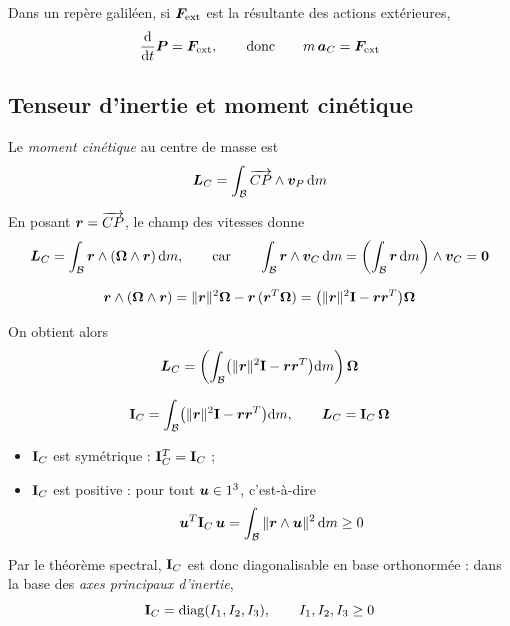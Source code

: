 \begin{theoreme}
    Dans un repère galiléen, si $\bm{F}_{\mathrm{ext}}$ est la
    résultante des actions extérieures,
    \[
        \frac{\mathrm{d}}{\mathrm{d} t}\bm{P} = \bm{F}_{\mathrm{ext}},
        \qquad\text{donc}\qquad
        m\,\bm{a}_C = \bm{F}_{\mathrm{ext}}
    \]
\end{theoreme}

\subsection{Tenseur d'inertie et moment cinétique}

\begin{definition}
    Le \emph{moment cinétique} au centre de masse est
    \[
        \bm{L}_C = \int_{\mathcal{B}}
        \overrightarrow{CP}\wedge\bm{v}_P\,\mathrm{d} m
    \]
\end{definition}

En posant $\bm{r} = \overrightarrow{CP}$, le champ des vitesses donne
\[
    \bm{L}_C = \int_{\mathcal{B}}
    \bm{r}\wedge(\bm{\Omega}\wedge\bm{r})\,\mathrm{d} m,
    \qquad\text{car}\qquad
    \int_{\mathcal{B}} \bm{r}\wedge\bm{v}_C\,\mathrm{d} m
    = \left(\int_{\mathcal{B}}\bm{r}\,\mathrm{d} m\right)\wedge\bm{v}_C
    = \bm{0}
\]

\begin{proposition}
    \[
        \bm{r}\wedge(\bm{\Omega}\wedge\bm{r})
        = \|\bm{r}\|^2\bm{\Omega} - \bm{r}\,(\bm{r}^T\bm{\Omega})
        = \bigl(\|\bm{r}\|^2\mathbf{I} - \bm{r}\bm{r}^T\bigr)\bm{\Omega}
    \]
\end{proposition}

On obtient alors
\[
    \bm{L}_C = \left(\int_{\mathcal{B}}
    \bigl(\|\bm{r}\|^2\mathbf{I} - \bm{r}\bm{r}^T\bigr)\mathrm{d} m\right)
    \bm{\Omega}
\]

\begin{definition}
    \[
        \mathbf{I}_C = \int_{\mathcal{B}}
        \bigl(\|\bm{r}\|^2\mathbf{I} - \bm{r}\bm{r}^T\bigr)\mathrm{d} m,
        \qquad
        \bm{L}_C = \mathbf{I}_C\,\bm{\Omega}
    \]
\end{definition}

\begin{theoreme}
    \leavevmode
    \begin{itemize}
        \item $\mathbf{I}_C$ est symétrique : $\mathbf{I}_C^T = \mathbf{I}_C$ ;
        \item $\mathbf{I}_C$ est positive : pour tout $\bm{u}\in1^3$,  c'est-à-dire
            \[
                \bm{u}^T\mathbf{I}_C\,\bm{u}
                = \int_{\mathcal{B}}\|\bm{r}\wedge\bm{u}\|^2\,\mathrm{d} m
                \geq 0
            \]
    \end{itemize}
    Par le théorème spectral, $\mathbf{I}_C$ est donc diagonalisable en
    base orthonormée : dans la base des \emph{axes principaux
    d'inertie},
    \[
        \mathbf{I}_C = \mathrm{diag}(I_1,I_2,I_3),
        \qquad I_1, I_2, I_3 \geq 0
    \]
\end{theoreme}


